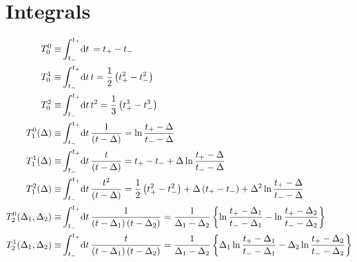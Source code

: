 \documentclass[english,notitlepage]{article}
\begin{document}
\section{Integrals}
    \begin{subequations}
        \begin{align}
            T^0_0 \equiv                     & \int_{t_-}^{t_+} \!\mathrm{d}t\, = t_+ - t_-                                                                                                                                                                                \\
            T^1_0 \equiv                     & \int_{t_-}^{t_+} \!\mathrm{d}t\, t = \frac{1}{2} \pclosed{t_+^2 - t_-^2}                                                                                                                                                    \\
            T^2_0 \equiv                     & \int_{t_-}^{t_+} \!\mathrm{d}t\, t^2 = \frac{1}{3} \pclosed{t_+^3 - t_-^3}                                                                                                                                                  \\
            T_1^0(\Delta) \equiv             & \int_{t_-}^{t_+} \!\mathrm{d}t\, \frac{1}{\pclosed{t-\Delta}} = \ln\frac{t_+ - \Delta}{t_- - \Delta}                                                                                                                        \\
            T_1^1(\Delta) \equiv             & \int_{t_-}^{t_+} \!\mathrm{d}t\, \frac{t}{\pclosed{t-\Delta}} = t_+ - t_- + \Delta \ln\frac{t_+ - \Delta}{t_- - \Delta}                                                                                                     \\
            T_1^2(\Delta) \equiv             & \int_{t_-}^{t_+} \!\mathrm{d}t\, \frac{t^2}{\pclosed{t-\Delta}} = \frac{1}{2}\pclosed{t_+^2 - t_-^2} + \Delta \pclosed{t_+ - t_-} + \Delta^2 \ln\frac{t_+ - \Delta}{t_- - \Delta}                                           \\
            T_2^0(\Delta_1, \Delta_2) \equiv & \int_{t_-}^{t_+} \!\mathrm{d}t\, \frac{1}{\pclosed{t-\Delta_1}\pclosed{t-\Delta_2}} = \frac{1}{\Delta_1 - \Delta_2} \cclosed{\ln\frac{t_+-\Delta_1}{t_--\Delta_1} - \ln\frac{t_+-\Delta_2}{t_--\Delta_2}}                   \\
            T_2^1(\Delta_1, \Delta_2) \equiv & \int_{t_-}^{t_+} \!\mathrm{d}t\, \frac{t}{\pclosed{t-\Delta_1}\pclosed{t-\Delta_2}} = \frac{1}{\Delta_1 - \Delta_2} \cclosed{\Delta_1 \ln\frac{t_+-\Delta_1}{t_--\Delta_1} - \Delta_2 \ln\frac{t_+-\Delta_2}{t_--\Delta_2}} \\

\end{align}
\end{subequations}
\end{document}
